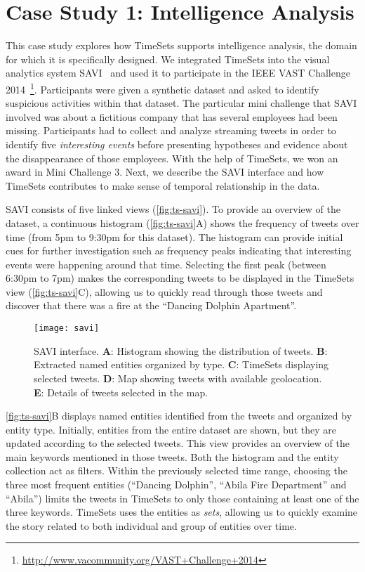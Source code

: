 \section{Case Study 1: Intelligence Analysis}
\label{sub:ts-vast}
This case study explores how TimeSets supports intelligence analysis, the domain for which it is specifically designed. We integrated TimeSets into the visual analytics system SAVI~\cite{Xu2014} and used it to participate in the IEEE VAST Challenge 2014~\footnote{\url{http://www.vacommunity.org/VAST+Challenge+2014}}. Participants were given a synthetic dataset and asked to identify suspicious activities within that dataset. The particular mini challenge that SAVI involved was about a fictitious company that has several employees had been missing. Participants had to collect and analyze streaming tweets in order to identify five \emph{interesting events} before presenting hypotheses and evidence about the disappearance of those employees. With the help of TimeSets, we won an award in Mini Challenge 3. Next, we describe the SAVI interface and how TimeSets contributes to make sense of temporal relationship in the data.

SAVI consists of five linked views (\autoref{fig:ts-savi}). To provide an overview of the dataset, a continuous histogram (\autoref{fig:ts-savi}A) shows the frequency of tweets over time (from 5pm to 9:30pm for this dataset). The histogram can provide initial cues for further investigation such as frequency peaks indicating that interesting events were happening around that time. Selecting the first peak (between 6:30pm to 7pm) makes the corresponding tweets to be displayed in the TimeSets view (\autoref{fig:ts-savi}C), allowing us to quickly read through those tweets and discover that there was a fire at the ``Dancing Dolphin Apartment''. 

\begin{figure}[!htb]
	\centering
	\texttt{[image: savi]}
	\caption[SAVI interface]{SAVI interface. \textbf{A}: Histogram showing the distribution of tweets. \textbf{B}: Extracted named entities organized by type. \textbf{C}: TimeSets displaying selected tweets. \textbf{D}: Map showing tweets with available geolocation. \textbf{E}: Details of tweets selected in the map.}
	\label{fig:ts-savi}
\end{figure}

\autoref{fig:ts-savi}B displays named entities identified from the tweets and organized by entity type. Initially, entities from the entire dataset are shown, but they are updated according to the selected tweets. This view provides an overview of the main keywords mentioned in those tweets. Both the histogram and the entity collection act as filters. Within the previously selected time range, choosing the three most frequent entities (``Dancing Dolphin'', ``Abila Fire Department'' and ``Abila'') limits the tweets in TimeSets to only those containing at least one of the three keywords. TimeSets uses the entities as \emph{sets}, allowing us to quickly examine the story related to both individual and group of entities over time.

